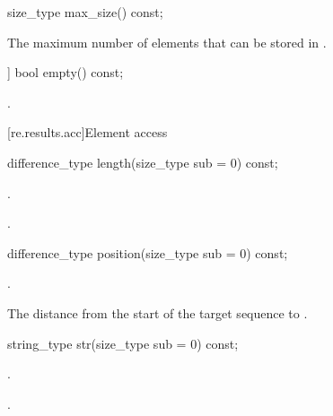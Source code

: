 %
\begin{itemdecl}
size_type max_size() const;
\end{itemdecl}

\begin{itemdescr}
\pnum
\returns
The maximum number of  elements that can be
stored in .
\end{itemdescr}

%
\begin{itemdecl}
[[nodiscard]] bool empty() const;
\end{itemdecl}

\begin{itemdescr}
\pnum
\returns
{}.
\end{itemdescr}

[re.results.acc]{Element access}

%
\begin{itemdecl}
difference_type length(size_type sub = 0) const;
\end{itemdecl}

\begin{itemdescr}
\pnum
\expects
{}.

\pnum
\returns
{}.
\end{itemdescr}

%
\begin{itemdecl}
difference_type position(size_type sub = 0) const;
\end{itemdecl}

\begin{itemdescr}
\pnum
\expects
{}.

\pnum
\returns
The distance from the start of the target sequence
to .
\end{itemdescr}

%
\begin{itemdecl}
string_type str(size_type sub = 0) const;
\end{itemdecl}

\begin{itemdescr}
\pnum
\expects
{}.

\pnum
\returns
{}.
\end{itemdescr}


